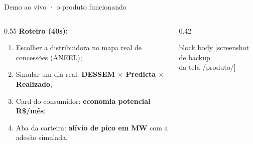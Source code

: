 \documentclass[aspectratio=169,11pt]{beamer}
\begin{document}
\begin{frame}{Demo ao vivo · o produto funcionando}
  \begin{columns}[T]
    \begin{column}{0.55\textwidth}
      \vspace{4mm}
      \textbf{Roteiro (40s):}
      \begin{enumerate}\setlength\itemsep{2mm}
        \item Escolher a distribuidora no mapa real de concessões (ANEEL);
        \item Simular um dia real: \textbf{DESSEM $\times$ Predicta $\times$ Realizado};
        \item Card do consumidor: \textbf{economia potencial R\$/mês};
        \item Aba da carteira: \textbf{alívio de pico em MW} com a adesão simulada.
      \end{enumerate}
    \end{column}
    \begin{column}{0.42\textwidth}
      \vspace{4mm}
      \begin{beamercolorbox}[rounded=true,sep=8mm]{block body}
        \centering\textcolor{cinza}{[screenshot de backup\\ da tela /produto/]}
      \end{beamercolorbox}
    \end{column}
  \end{columns}
\end{frame}
\end{document}
